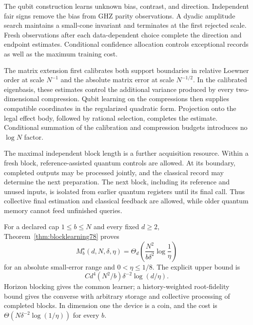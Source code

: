 The qubit construction learns unknown bias, contrast, and direction.
Independent fair signs remove the bias from GHZ parity observations.
A dyadic amplitude search maintains a small-cone invariant and
terminates at the first rejected scale.  Fresh observations after
each data-dependent choice complete the direction and endpoint
estimates.  Conditional confidence allocation controls exceptional
records as well as the maximum training cost.

The matrix extension first calibrates both support boundaries in
relative Loewner order at scale $N^{-1}$ and the absolute matrix
error at scale $N^{-1/2}$.  In the calibrated eigenbasis, these
estimates control the additional variance produced by every
two-dimensional compression.  Qubit learning on the compressions
then supplies compatible coordinates in the regularized quadratic
form.  Projection onto the legal effect body, followed by rational
selection, completes the estimate.  Conditional summation of the
calibration and compression budgets introduces no $\log N$ factor.

The maximal independent block length is a further acquisition
resource.  Within a fresh block, reference-assisted quantum controls
are allowed.  At its boundary, completed outputs may be processed
jointly, and the classical record may determine the next preparation.
The next block, including its reference and unused inputs, is
isolated from earlier quantum registers until its final call.
Thus collective final estimation and classical feedback are allowed,
while older quantum memory cannot feed unfinished queries.

For a declared cap $1\le b\le N$ and every fixed $d\ge2$,
Theorem~\ref{thm:blocklearning78} proves
\begin{equation}\label{eq:introblock78}
 M_b^\star(d,N,\delta,\eta)
 =\Theta_d\!\left(\frac{N^2}{b\delta^2}\log\frac1\eta\right)
\end{equation}
for an absolute small-error range and $0<\eta\le1/8$.  The
explicit upper bound is
\[
 Cd^4(N^2/b)\delta^{-2}\log(d/\eta).
\]
Horizon blocking gives the common learner; a history-weighted
root-fidelity bound gives the converse with arbitrary storage and
collective processing of completed blocks.  In dimension one the
device is a coin, and the cost is
$\Theta(N\delta^{-2}\log(1/\eta))$ for every $b$.

